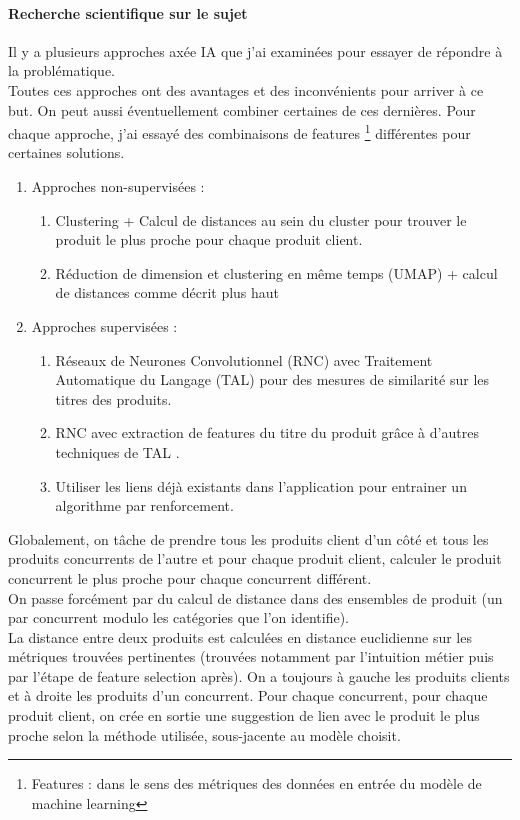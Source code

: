 \documentclass{rapportCS}
\begin{document}
\paragraph{Recherche scientifique sur le sujet}
Il y a plusieurs approches axée IA que j'ai examinées pour essayer de répondre à la problématique.\\
Toutes ces approches ont des avantages et des inconvénients pour arriver à ce but. On peut aussi éventuellement
combiner certaines de ces dernières.
Pour chaque approche, j'ai essayé des combinaisons de features \footnote[4]{Features : dans le sens des métriques
des données en entrée du modèle de machine learning} différentes pour certaines solutions.

\begin{enumerate}
  \item Approches non-supervisées :
  \begin{enumerate}
    \item Clustering + Calcul de distances au sein du cluster pour trouver le produit le plus proche
    pour chaque produit client.
    \item Réduction de dimension et clustering en même temps (UMAP) + calcul de distances comme décrit plus haut
  \end{enumerate}
  \item Approches supervisées :
  \begin{enumerate}
    \item Réseaux de Neurones Convolutionnel (RNC) avec Traitement Automatique du Langage (TAL)
    pour des mesures de similarité sur les titres des produits.
    \item RNC avec extraction de features du titre du produit grâce à d'autres techniques de TAL \cite{product_matching_ecommerce,xgboost}.
    \item Utiliser les liens déjà existants dans l'application pour entrainer un algorithme par renforcement.
  \end{enumerate}
\end{enumerate} 

Globalement, on tâche de prendre tous les produits client d'un côté et tous les produits concurrents de l'autre et
pour chaque produit client, calculer le produit concurrent le plus proche pour chaque concurrent différent.\\
On passe forcément par du calcul de distance dans des ensembles de produit 
(un par concurrent modulo les catégories que l'on identifie).\\
La distance entre deux produits est calculées en distance euclidienne sur les métriques trouvées pertinentes 
(trouvées notamment par l'intuition métier puis par l'étape de feature selection après).
On a toujours à gauche les produits clients et à droite les produits d'un concurrent.
Pour chaque concurrent, pour chaque produit client, on crée en sortie une suggestion de lien 
avec le produit le plus proche selon la méthode utilisée, sous-jacente au modèle choisit.
\end{document}
